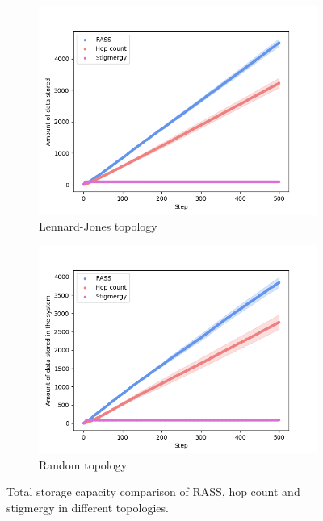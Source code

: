 \begin{figure}
\begin{subfigure}{0.45\textwidth}
        \includegraphics[width=\textwidth]{figures/dora_mesh/lennard_storage.png}
        \caption{Lennard-Jones topology}
        \label{results:lennard_100_storage}
    \end{subfigure}
    \begin{subfigure}{0.45\textwidth}
        \includegraphics[width=\textwidth]{figures/dora_mesh/random_storage.png}
        \caption{Random topology}
        \label{results:random_100_storage}
    \end{subfigure}
    \caption[RASS total storage]{Total storage capacity comparison of \ac{RASS}, hop count and stigmergy in different topologies.}
    \label{results:rass_storage}
\end{figure}

